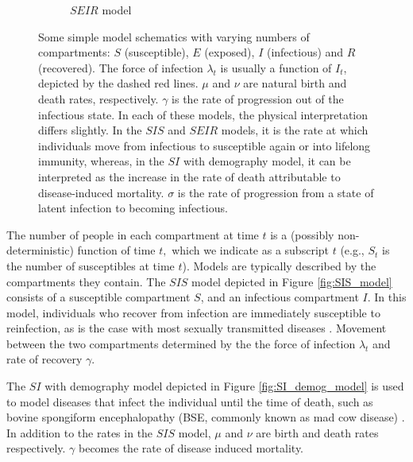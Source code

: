\begin{figure}[htbp]
\begin{subfigure}[b]{0.45\textwidth}
        \caption{$SEIR$ model}\label{fig:SEIR_model}
    \end{subfigure}%
    \caption{
        Some simple model schematics with varying numbers of compartments: $S$
        (susceptible), $E$ (exposed), $I$ (infectious) and $R$ (recovered). The
        force of infection $\lambda_t$ is usually a function of $I_t$, depicted
        by the dashed red lines. $\mu$ and $\nu$ are natural birth and death
        rates, respectively. $\gamma$ is the rate of progression out of the
        infectious state. In each of these models, the physical interpretation
        differs slightly. In the $SIS$ and $SEIR$ models, it is the rate at
        which individuals move from infectious to susceptible again or into
        lifelong immunity, whereas, in the $SI$ with demography model, it can be
        interpreted as the increase in the rate of death attributable to
        disease-induced mortality. $\sigma$ is the rate of progression from a
        state of latent infection to becoming infectious.
    }\label{fig:simple_models}
\end{figure}

The number of people in each compartment at time $t$ is a (possibly
non-deterministic) function of time $t,$ which we indicate as a subscript $t$
(e.g., $S_t$ is the number of susceptibles at time $t$). Models are typically
described by the compartments they contain. The $SIS$ model
depicted in Figure \ref{fig:SIS_model} consists of a susceptible compartment
$S$, and an infectious compartment $I$. In this model, individuals
who recover from infection are immediately susceptible to reinfection,
as is the case
with most sexually transmitted diseases \parencite[56]{keeling_modeling_2008}.
Movement between the two compartments determined
by the the force of infection $\lambda_t$ and rate of recovery $\gamma.$

The $SI$ with demography model depicted in Figure \ref{fig:SI_demog_model} is
used to model diseases
that infect the individual until the time of death, such as bovine spongiform
encephalopathy (BSE, commonly known as mad cow disease)
\parencite{hagenaars_epidemiological_2006}.
In addition to the rates in the $SIS$ model, $\mu$ and $\nu$ are birth and
death rates respectively. $\gamma$ becomes the rate of disease
induced mortality.

